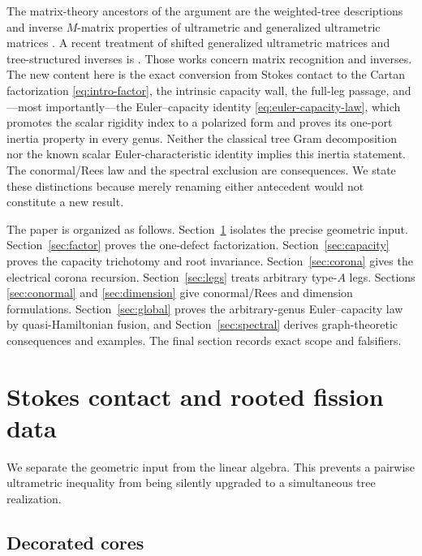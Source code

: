 \documentclass[11pt,a4paper]{amsart}
\theoremstyle{plain}
\theoremstyle{definition}
\begin{document}
The matrix-theory ancestors of the argument are the weighted-tree descriptions and inverse
$M$-matrix properties of ultrametric and generalized ultrametric matrices
\cite{MartinezMichonSanMartin1994,McDonaldEtAl1995,NabbenVarga1995}.  A recent treatment of shifted
generalized ultrametric matrices and tree-structured inverses is \cite{Nabben2026Acyclic}.  Those
works concern matrix recognition and inverses.  The new content here is the exact conversion from
Stokes contact to the Cartan factorization \eqref{eq:intro-factor}, the intrinsic capacity wall,
the full-leg passage, and---most importantly---the Euler--capacity identity
\eqref{eq:euler-capacity-law}, which promotes the scalar rigidity index to a polarized form and
proves its one-port inertia property in every genus.  Neither the classical tree Gram decomposition nor
the known scalar Euler-characteristic identity implies this inertia statement.  The conormal/Rees
law and the spectral exclusion are consequences.  We state these distinctions because merely
renaming either antecedent would not constitute a new result.

The paper is organized as follows.  Section~\ref{sec:geometry} isolates the precise geometric
input.  Section~\ref{sec:factor} proves the one-defect factorization.  Section~\ref{sec:capacity}
proves the capacity trichotomy and root invariance.  Section~\ref{sec:corona} gives the electrical
corona recursion.  Section~\ref{sec:legs} treats arbitrary type-$A$ legs.  Sections
\ref{sec:conormal} and \ref{sec:dimension} give conormal/Rees and dimension formulations.
Section~\ref{sec:global} proves the arbitrary-genus Euler--capacity law by quasi-Hamiltonian
fusion, and
Section~\ref{sec:spectral} derives graph-theoretic consequences and examples.  The final section
records exact scope and falsifiers.

\section{Stokes contact and rooted fission data}\label{sec:geometry}

We separate the geometric input from the linear algebra.  This prevents a pairwise ultrametric
inequality from being silently upgraded to a simultaneous tree realization.

\subsection{Decorated cores}
\end{document}
